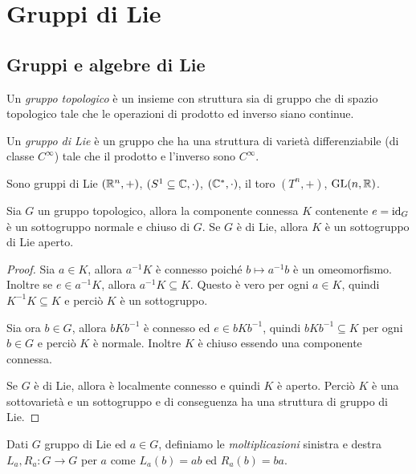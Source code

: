 \chapter{Gruppi di Lie}

\section{Gruppi e algebre di Lie}

\begin{definition} 
	Un \emph{gruppo topologico} è un insieme con struttura sia di gruppo che di spazio topologico tale che le operazioni di prodotto ed inverso siano continue.
\end{definition}

\begin{definition} 
	Un \emph{gruppo di Lie} è un gruppo che ha una struttura di varietà differenziabile (di classe $C^\infty$) tale che il prodotto e l'inverso sono $C^\infty$.
\end{definition}

\begin{example}
	Sono gruppi di Lie $(\mathbb R^n,+)$, $(S^1\subseteq \mathbb C, \cdot)$, $(\mathbb C^*,\cdot)$, il toro $(T^n, +)$, $\mathrm{GL}(n,\mathbb R)$.
\end{example}

\begin{proposition}
	Sia $G$ un gruppo topologico, allora la componente connessa $K$ contenente $e=\mathrm{id}_G$ è un sottogruppo normale e chiuso di $G$. Se $G$ è di Lie, allora $K$ è un sottogruppo di Lie aperto.
\end{proposition}
\begin{proof}
	Sia $a\in K$, allora $a^{-1}K$ è connesso poiché $b\mapsto a^{-1}b$ è un omeomorfismo.
	Inoltre se $e\in a^{-1}K$, allora $a^{-1}K\subseteq K$. Questo è vero per ogni $a\in K$, quindi $K^{-1}K\subseteq K$ e perciò $K$ è un sottogruppo.
	
	Sia ora $b\in G$, allora $bKb^{-1}$ è connesso ed $e\in bKb^{-1}$, quindi $bKb^{-1}\subseteq K$ per ogni $b\in G$ e perciò $K$ è normale. Inoltre $K$ è chiuso essendo una componente connessa.
	
	Se $G$ è di Lie, allora è localmente connesso e quindi $K$ è aperto. Perciò $K$ è una sottovarietà e un sottogruppo e di conseguenza ha una struttura di gruppo di Lie.
\end{proof}


\begin{definition} 
	Dati $G$ gruppo di Lie ed $a\in G$, definiamo le \emph{moltiplicazioni} sinistra e destra $L_a,R_a:G\to G$ per $a$ come $L_a(b) = ab$ ed $R_a(b) = ba$.
\end{definition}

